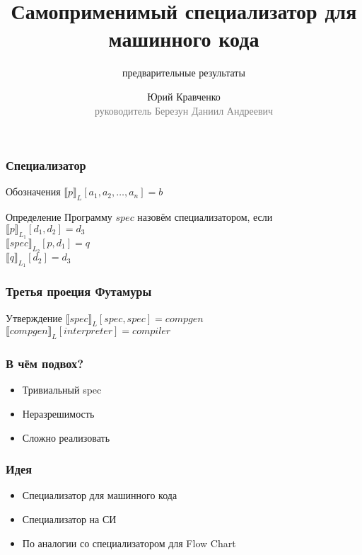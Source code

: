 \documentclass{beamer}
\begin{document}
\title{Самоприменимый специализатор для машинного кода}
\subtitle{предварительные результаты}
\author{Юрий Кравченко\\{\footnotesize\textcolor{gray}{руководитель Березун Даниил Андреевич}}}
\frame{\titlepage}

\begin{frame}\frametitle{Специализатор}
\begin{block}{Обозначения}
$\llbracket p \rrbracket_L [a_1, a_2, \dots, a_n] = b$
\end{block}
\pause
\begin{block}{Определение}
Программу $spec$ назовём специализатором, если\\
$\llbracket p \rrbracket_{L_1} [d_1, d_2] = d_3$\\
$\llbracket spec \rrbracket_{L_2} [p, d_1] = q$\\
$\llbracket q \rrbracket_{L_1} [d_2] = d_3$\\
\end{block}
\end{frame}

\begin{frame}\frametitle{Третья проеция Футамуры}
\begin{block}{Утверждение}
$\llbracket spec \rrbracket_L [spec, spec] = compgen$ \\
$\llbracket compgen \rrbracket_L [interpreter] = compiler$\\
\end{block}

\end{frame}


\begin{frame}\frametitle{В чём подвох?}
\begin{itemize}
    \item<2-> {Тривиальный spec}
    \item<3-> {Неразрешимость}
    \item<4-> {Сложно реализовать}
\end{itemize}
\end{frame}

\begin{frame}\frametitle{Идея}
\begin{itemize}
    \item<2-> {Специализатор для машинного кода}
    \item<3-> {Специализатор на СИ}
    \item<4-> {По аналогии со специализатором для Flow Chart}
\end{itemize}
\end{frame}
\end{document}
